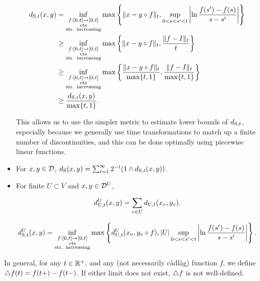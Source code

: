 \begin{itemize}
\begin{align*}
\stmet{t}(\xf,\xg) &= \inf_{\substack{f:[0,t]\ra[0,t]\\\te{cts}\\\te{str. increasing}}}\max\left\{\|\xf-\xg\circ f\|\tpara{t},\sup_{0<s<s'<t}\left|\ln \frac{f(s') -f(s)}{s-s'}\right|\right\}\\
&\geq \inf_{\substack{f:[0,t]\ra[0,t]\\\te{cts}\\\te{str. increasing}}}\max\left\{\|\xf-\xg\circ f\|\tpara{t},\frac{\|f-I\|_t}{t}\right\}\\
&\geq \inf_{\substack{f:[0,t]\ra[0,t]\\\te{cts}\\\te{str. increasing}}}\max\left\{\frac{\|\xf-\xg\circ f\|\tpara{t}}{\max\{t,1\}},\frac{\|f-I\|_t}{\max\{t,1\}}\right\}\\
&\geq \frac{\stmet{t}(\xf,\xg)}{\max\{t,1\}}.
\end{align*}

\ind This allows us to use the simpler metric to estimate lower bounds of \(\stmet{t}\), especially because we generally use time transformations to match up a finite number of discontinuities, and this can be done optimally using piecewise linear functions.

\item For \(x,y \in \mathcal{D}\), \(\stmet{}(\xf,\xg) = \sum_{t=1}^\infty 2^{-t}(1\wedge \stmet{t}(\xf,\xg))\). 

\item For finite \(U \subset V\) and \(x,y\in\mathcal{D}^{U}\),

\[\utmet{t}\vpara{U}(\xf,\xg) = \sum_{v\in U}\utmet{t}(\xf\vind{v},\xg\vind{v}).\]

\[\stmet{t}\vpara{U}(\xf,\xg) = \inf_{\substack{f:[0,t]\ra[0,t]\\\te{cts}\\\te{str. increasing}}} \max\left\{\utmet{t}^U(\xf\vind{v},\xg\vind{v}\circ f), |U|\sup_{0 < s < s' < t}\left|\ln\frac{f(s')-f(s)}{s-s'}\right|\right\}.\]
\end{itemize}

 In general, for any \(t\in\mathbb{R}^+\), and any (not necessarily c\`adl\`ag) function \(f\), we define \(\triangle f(t) = f(t+) - f(t-)\). If either limit does not exist, \(\triangle f\) is not well-defined.

